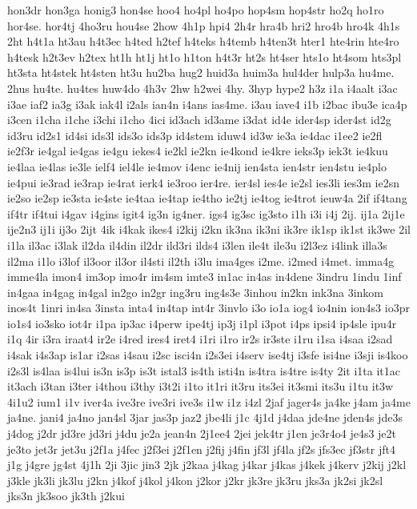{hon3dr
hon3ga
honig3
hon4se
hoo4
ho4pl
ho4po
hop4sm
hop4str
ho2q
ho1ro
hor4se.
hor4tj
4ho3ru
hou4se
2how
4h1p
hpi4
2h4r
hra4b
hri2
hro4b
hro4k
4h1s
2ht
h4t1a
ht3au
h4t3ec
h4ted
h2tef
h4teks
h4temb
h4ten3t
hter1
hte4rin
hte4ro
h4tesk
h2t3ev
h2tex
ht1h
ht1j
ht1o
h1ton
h4t3r
ht2s
ht4ser
hts1o
ht4som
hts3pl
ht3sta
ht4stek
ht4sten
ht3u
hu2ba
hug2
huid3a
huim3a
hul4der
hulp3a
hu4me.
2hus
hu4te.
hu4tes
huw4do
4h3v
2hw
h2wei
4hy.
3hyp
hype2
h3z
i1a
i4aalt
i3ac
i3ae
iaf2
ia3g
i3ak
iak4l
i2als
ian4n
i4ans
ias4me.
i3au
iave4
i1b
i2bac
ibu3e
ica4p
i3cen
i1cha
i1che
i3chi
i1cho
4ici
id3ach
id3ame
i3dat
id4e
ider4sp
ider4st
id2g
id3ru
id2s1
id4si
ids3l
ids3o
ids3p
id4stem
iduw4
id3w
ie3a
ie4dac
i1ee2
ie2fl
ie2f3r
ie4gal
ie4gas
ie4gu
iekes4
ie2kl
ie2kn
ie4kond
ie4kre
ieks3p
iek3t
ie4kuu
ie4laa
ie4las
ie3le
ielf4
iel4le
ie4mov
i4enc
ie4nij
ien4sta
ien4str
ien4stu
ie4plo
ie4pui
ie3rad
ie3rap
ie4rat
ierk4
ie3roo
ier4re.
ier4sl
ies4e
ie2sl
ies3li
ies3m
ie2sn
ie2so
ie2sp
ie3sta
ie4ste
ie4taa
ie4tap
ie4tho
ie2tj
ie4tog
ie4trot
ieuw4a
2if
if4tang
if4tr
if4tui
i4gav
i4gins
igit4
ig3n
ig4ner.
igs4
ig3sc
ig3sto
i1h
i3i
i4j
2ij.
ij1a
2ij1e
ije2n3
ij1i
ij3o
2ijt
4ik
i4kak
ikes4
i2kij
i2kn
ik3na
ik3ni
ik3re
ik1sp
ik1st
ik3we
2il
i1la
il3ac
i3lak
il2da
il4din
il2dr
ild3ri
ilds4
i3len
ile4t
ile3u
i2l3ez
i4link
illa3s
il2ma
i1lo
i3lof
il3oor
il3or
il4sti
il2th
i3lu
ima4ges
i2me.
i2med
i4met.
imma4g
imme4la
imon4
im3op
imo4r
im4sm
imte3
in1ac
in4as
in4dene
3indru
1indu
1inf
in4gaa
in4gag
in4gal
in2go
in2gr
ing3ru
ing4s3e
3inhou
in2kn
ink3na
3inkom
inos4t
1inri
in4sa
3insta
inta4
in4tap
int4r
3invlo
i3o
io1a
iog4
io4nin
ion4s3
io3pr
io1s4
io3sko
iot4r
i1pa
ip3ac
i4perw
ipe4tj
ip3j
i1pl
i3pot
i4ps
ipsi4
ip4sle
ipu4r
i1q
4ir
i3ra
iraat4
ir2e
i4red
ires4
iret4
i1ri
i1ro
ir2s
ir3ste
i1ru
i1sa
i4saa
i2sad
i4sak
i4s3ap
is1ar
i2sas
i4sau
i2sc
isci4n
i2s3ei
i4serv
ise4tj
i3sfe
isi4ne
i3sji
is4koo
i2s3l
is4laa
is4lui
is3n
is3p
is3t
istal3
is4th
isti4n
is4tra
is4tre
is4ty
2it
i1ta
it1ac
it3ach
i3tan
i3ter
i4thou
i3thy
i3t2i
i1to
it1ri
it3ru
its3ei
it3smi
its3u
i1tu
it3w
4i1u2
ium1
i1v
iver4a
ive3re
ive3ri
ive3s
i1w
i1z
i4zl
2jaf
jager4s
ja4ke
j4am
ja4me
ja4ne.
jani4
ja4no
jan4sl
3jar
jas3p
jaz2
jbe4li
j1c
4j1d
j4daa
jde4ne
jden4s
jde3s
j4dog
j2dr
jd3re
jd3ri
j4du
je2a
jean4n
2j1ee4
2jei
jek4tr
j1en
je3r4o4
je4s3
je2t
je3to
jet3r
jet3u
j2f1a
j4fec
j2f3ei
j2f1en
j2fij
j4fin
jf3l
jf4la
jf2s
jfs3ec
jf3str
jft4
j1g
j4gre
jg4st
4j1h
2ji
3jic
jin3
2jk
j2kaa
j4kag
j4kar
j4kas
j4kek
j4kerv
j2kij
j2kl
j3kle
jk3li
jk3lu
j2kn
j4kof
j4kol
j4kon
j2kor
j2kr
jk3re
jk3ru
jks3a
jk2si
jk2sl
jks3n
jk3soo
jk3th
j2kui
}
